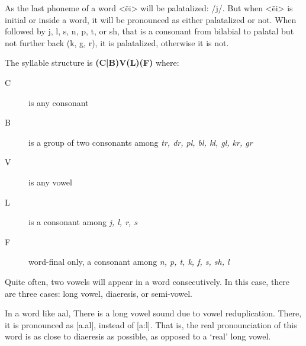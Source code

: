 As the last phoneme of a word <ẽi> will be palatalized: /{\ipaET}j/. But when <ẽi> is initial or inside a word, it will be pronounced as either palatalized or not. When followed by j, l, s, n, p, t, or sh, that is a consonant from bilabial to palatal but not further back (k, g, r), it is palatalized, otherwise it is not.

The syllable structure is \textbf{(C|B)V(L)(F)} where:
\begin{description}
\item[C] is any consonant
\item[B] is a group of two consonants among \emph{tr, dr, pl, bl, kl, gl, kr, gr}
\item[V] is any vowel
\item[L] is a consonant among \emph{j, l, r, s}
\item[F] word-final only, a consonant among \emph{n, p, t, k, f, s, sh, l}
\end{description}

Quite often, two vowels will appear in a word consecutively. In this case, there are three cases: long vowel, diaeresis, or semi-vowel.

In a word like \gls{aal}, There is a long vowel sound due to vowel reduplication. There, it is pronounced as [a.al], instead of [a:l]. That is, the real pronounciation of this word is as close to diaeresis as possible, as opposed to a ‘real’ long vowel.


